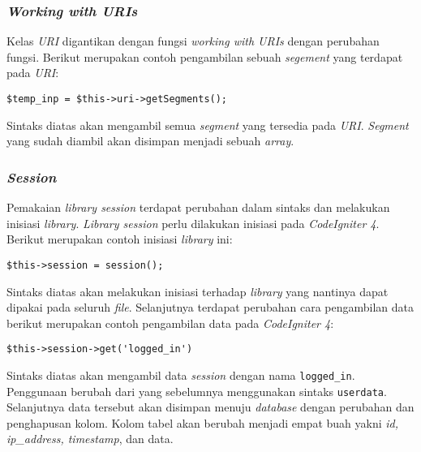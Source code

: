 \subsubsection{\textit{Working with URIs}}
Kelas \textit{URI} digantikan dengan fungsi \textit{working with URIs} dengan perubahan fungsi. Berikut merupakan contoh pengambilan sebuah \textit{segement} yang terdapat pada \textit{URI}:
\begin{center}
	\verb|$temp_inp = $this->uri->getSegments();|
\end{center}
Sintaks diatas akan mengambil semua \textit{segment} yang tersedia pada \textit{URI}. \textit{Segment} yang sudah diambil akan disimpan menjadi sebuah \textit{array}.

\subsubsection{\textit{Session}}
Pemakaian \textit{library session} terdapat perubahan dalam sintaks dan melakukan inisiasi \textit{library}. \textit{Library session} perlu dilakukan inisiasi pada \textit{CodeIgniter 4}. Berikut merupakan contoh inisiasi \textit{library} ini:
\begin{center}
	\verb|$this->session = session();|
\end{center}
Sintaks diatas akan melakukan inisiasi terhadap \textit{library} yang nantinya dapat dipakai pada seluruh \textit{file}. Selanjutnya terdapat perubahan cara pengambilan data berikut merupakan contoh pengambilan data pada \textit{CodeIgniter 4}:
\begin{center}
	\verb|$this->session->get('logged_in')|
\end{center}
Sintaks diatas akan mengambil data \textit{session} dengan nama \texttt{logged\_in}. Penggunaan berubah dari yang sebelumnya menggunakan sintaks \texttt{userdata}. Selanjutnya data tersebut akan disimpan menuju \textit{database} dengan perubahan dan penghapusan kolom. Kolom tabel akan berubah menjadi empat buah yakni \textit{id, ip\_address, timestamp}, dan data.

